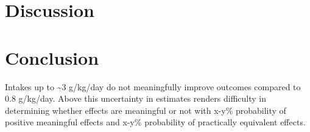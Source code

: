 \documentclass[
]{article}
\begin{document}
\section{Discussion}\label{discussion}

\section{Conclusion}\label{conclusion}

Intakes up to \textasciitilde3 g/kg/day do not meaningfully improve
outcomes compared to 0.8 g/kg/day. Above this uncertainty in estimates
renders difficulty in determining whether effects are meaningful or not
with x-y\% probability of positive meaningful effects and x-y\%
probability of practically equivalent effects.

\protect{}\label{refs}
\end{document}
